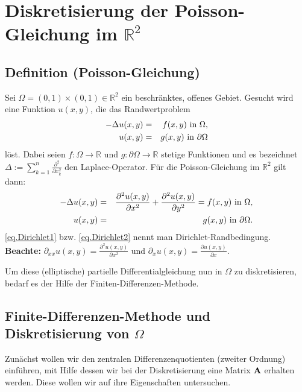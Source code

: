 \chapter{Diskretisierung der Poisson-Gleichung im $\mathbb{R}^{2}$}\label{c.Diskretisierte Poisson-Gleichung}

\section{Definition (Poisson-Gleichung)}\label{s.Poisson-Gleichung}

Sei $\Omega = (0,1)\times(0,1) \in \mathbb{R}^{2}$ ein beschränktes, offenes Gebiet. Gesucht wird eine Funktion $u(x,y)$, die das Randwertproblem
\begin{eqnarray}
-\Delta u(x,y) &=& f(x,y) \textnormal{ in } \Omega, \\
u(x,y) &=& g(x,y) \textnormal{ in } \partial \Omega\label{eq.Dirichlet1}
\end{eqnarray}
löst.
Dabei seien $f: \Omega \rightarrow \mathbb{R}$ und $g: \partial\Omega \rightarrow \mathbb{R}$ stetige Funktionen und es bezeichnet $\Delta := \sum\limits_{k=1}^{n} \frac {\partial^{2}} {\partial x_{k}^{2}}$ den Laplace-Operator. Für die Poisson-Gleichung im $\mathbb{R}^{2}$ gilt dann:
\begin{eqnarray}
-\Delta u(x,y) &=& \frac {\partial^{2} u(x,y)} {\partial x^{2}} + \frac {\partial^{2} u(x,y)} {\partial y^{2}} = f(x,y) \textnormal{ in } \Omega, \\
u(x,y) &=& g(x,y) \textnormal{ in } \partial \Omega.\label{eq.Dirichlet2}
\end{eqnarray}
\autoref{eq.Dirichlet1} bzw. \autoref{eq.Dirichlet2} nennt man Dirichlet-Randbedingung.\\

\textbf{Beachte:} $\partial_{xx}u(x,y) = \frac {\partial^{2}u(x,y)} {\partial x^{2}}$ und $\partial_{x}u(x,y) = \frac {\partial u(x,y)} {\partial x}$.

Um diese (elliptische) partielle Differentialgleichung nun in $\Omega$ zu diskretisieren, bedarf es der Hilfe der Finiten-Differenzen-Methode.

\section{Finite-Differenzen-Methode und Diskretisierung von $\Omega$}\label{s.Finite Differenzen}

Zunächst wollen wir den zentralen Differenzenquotienten (zweiter Ordnung) einführen, mit Hilfe dessen wir bei der Diskretisierung eine Matrix ${\textbf{A}}$ erhalten werden. Diese wollen wir auf ihre Eigenschaften untersuchen.

